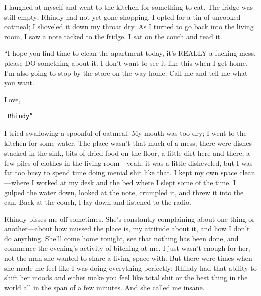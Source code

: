 I laughed at myself and went to the kitchen for something to eat. The
fridge was still empty; Rhindy had not yet gone shopping. I opted for a
tin of uncooked oatmeal; I shoveled it down my throat dry. As I turned
to go back into the living room, I saw a note tacked to the fridge. I
sat on the couch and read it.

``I hope you find time to clean the apartment today, it's REALLY a
fucking mess, please DO something about it. I don't want to see it like
this when I get home. I'm also going to stop by the store on the way
home. Call me and tell me what you want.

Love,

\begin{verbatim}
 Rhindy”
\end{verbatim}

I tried swallowing a spoonful of oatmeal. My mouth was too dry; I went
to the kitchen for some water. The place wasn't that much of a mess;
there were dishes stacked in the sink, bits of dried food on the floor,
a little dirt here and there, a few piles of clothes in the living
room---yeah, it was a little disheveled, but I was far too busy to spend
time doing menial shit like that. I kept my own space clean---where I
worked at my desk and the bed where I slept some of the time. I gulped
the water down, looked at the note, crumpled it, and threw it into the
can. Back at the couch, I lay down and listened to the radio.

Rhindy pisses me off sometimes. She's constantly complaining about one
thing or another---about how mussed the place is, my attitude about it,
and how I don't do anything. She'll come home tonight, see that nothing
has been done, and commence the evening's activity of bitching at me. I
just wasn't enough for her, not the man she wanted to share a living
space with. But there were times when she made me feel like I was doing
everything perfectly; Rhindy had that ability to shift her moods and
either make you feel like total shit or the best thing in the world all
in the span of a few minutes. And she called me insane.

